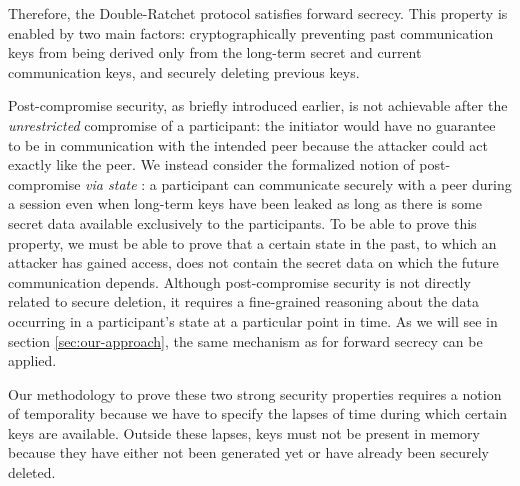 \documentclass{article}
\begin{document}
Therefore, the Double-Ratchet protocol satisfies forward secrecy. This property is enabled by two main factors: cryptographically preventing past communication keys from being derived only from the long-term secret and current communication keys, and securely deleting previous keys.

Post-compromise security, as briefly introduced earlier, is not achievable after the \emph{unrestricted} compromise of a participant: the initiator would have no guarantee to be in communication with the intended peer because the attacker could act exactly like the peer.
We instead consider the formalized notion of post-compromise \emph{via state} \cite{7536374}:
a participant can communicate securely with a peer during a session even when long-term keys have been leaked as long as there is some secret data available exclusively to the participants.
To be able to prove this property, we must be able to prove that a certain state in the past, to which an attacker has gained access, does not contain the secret data on which the future communication depends. %
Although post-compromise security is not directly related to secure deletion, it requires a fine-grained reasoning about the data occurring in a participant's state at a particular point in time. As we will see in section \ref*{sec:our-approach}, the same mechanism as for forward secrecy can be applied.

Our methodology to prove these two strong security properties requires a notion of temporality because we have to specify the lapses of time during which certain keys are available. Outside these lapses, keys must not be present in memory because they have either not been generated yet or have already been securely deleted.
\end{document}
